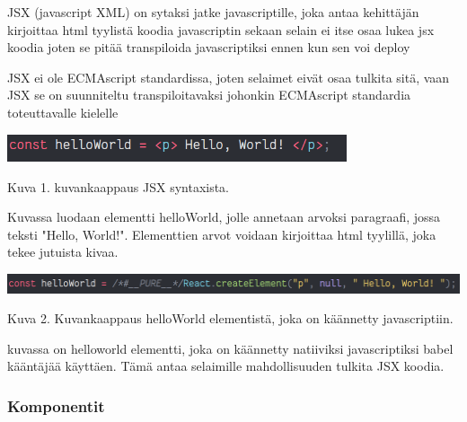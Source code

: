 \documentclass[11pt,a4paper,titlepage,oneside]{article}
\begin{document}


JSX (javascript XML) on sytaksi jatke javascriptille, joka antaa kehittäjän kirjoittaa html tyylistä koodia javascriptin sekaan
selain ei itse osaa lukea jsx koodia joten se pitää transpiloida javascriptiksi ennen kun sen voi deploy



JSX ei ole ECMAscript standardissa, joten selaimet eivät osaa tulkita sitä, vaan JSX se on suunniteltu transpiloitavaksi johonkin ECMAscript standardia toteuttavalle kielelle
\medskip

\bigskip
\includegraphics[width=10cm]{src/public/oppar/pure_jsx_example.png}

Kuva 1. kuvankaappaus JSX syntaxista.
\medskip

Kuvassa luodaan elementti helloWorld, jolle annetaan arvoksi paragraafi, jossa teksti "Hello, World!"{}.
Elementtien arvot voidaan kirjoittaa html tyylillä, joka tekee jutuista kivaa.
\medskip



\bigskip
\includegraphics[width=15cm]{src/public/oppar/transpiled_jsx_example.png}

Kuva 2. Kuvankaappaus helloWorld elementistä, joka on käännetty javascriptiin. 
\medskip


kuvassa on helloworld elementti, joka on käännetty natiiviksi javascriptiksi babel kääntäjää käyttäen.
Tämä antaa selaimille mahdollisuuden tulkita JSX koodia.
\medskip



\subsubsection{Komponentit}
\end{document}
